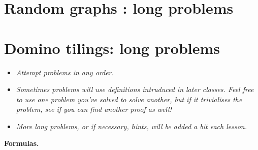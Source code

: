 \documentclass[11pt,fleqn]{book} %
\begin{document}
  \renewcommand*\rmdefault{ppl}\normalfont\upshape


\setcounter{problem}{0}






\newpage
\chapter*{Random graphs : long problems}









\newpage
\chapter*{Domino tilings: long problems}

\begin{itemize}
 \item \textit{Attempt problems in any order.}
 \item \textit{Sometimes problems will use definitions intruduced in later classes. Feel free to use one problem you've solved to solve another, but if it trivialises the problem, see if you can find another proof as well!}
 \item \textit{More long problems, or if necessary, hints, will be added a bit each lesson.}
\end{itemize}



\textbf{Formulas.}
\end{document}

